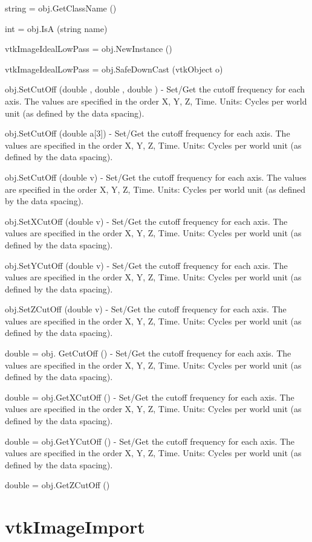 \begin{DoxyItemize}
\item {\ttfamily string = obj.\-Get\-Class\-Name ()}  
\item {\ttfamily int = obj.\-Is\-A (string name)}  
\item {\ttfamily vtk\-Image\-Ideal\-Low\-Pass = obj.\-New\-Instance ()}  
\item {\ttfamily vtk\-Image\-Ideal\-Low\-Pass = obj.\-Safe\-Down\-Cast (vtk\-Object o)}  
\item {\ttfamily obj.\-Set\-Cut\-Off (double , double , double )} -\/ Set/\-Get the cutoff frequency for each axis. The values are specified in the order X, Y, Z, Time. Units\-: Cycles per world unit (as defined by the data spacing).  
\item {\ttfamily obj.\-Set\-Cut\-Off (double a\mbox{[}3\mbox{]})} -\/ Set/\-Get the cutoff frequency for each axis. The values are specified in the order X, Y, Z, Time. Units\-: Cycles per world unit (as defined by the data spacing).  
\item {\ttfamily obj.\-Set\-Cut\-Off (double v)} -\/ Set/\-Get the cutoff frequency for each axis. The values are specified in the order X, Y, Z, Time. Units\-: Cycles per world unit (as defined by the data spacing).  
\item {\ttfamily obj.\-Set\-X\-Cut\-Off (double v)} -\/ Set/\-Get the cutoff frequency for each axis. The values are specified in the order X, Y, Z, Time. Units\-: Cycles per world unit (as defined by the data spacing).  
\item {\ttfamily obj.\-Set\-Y\-Cut\-Off (double v)} -\/ Set/\-Get the cutoff frequency for each axis. The values are specified in the order X, Y, Z, Time. Units\-: Cycles per world unit (as defined by the data spacing).  
\item {\ttfamily obj.\-Set\-Z\-Cut\-Off (double v)} -\/ Set/\-Get the cutoff frequency for each axis. The values are specified in the order X, Y, Z, Time. Units\-: Cycles per world unit (as defined by the data spacing).  
\item {\ttfamily double = obj. Get\-Cut\-Off ()} -\/ Set/\-Get the cutoff frequency for each axis. The values are specified in the order X, Y, Z, Time. Units\-: Cycles per world unit (as defined by the data spacing).  
\item {\ttfamily double = obj.\-Get\-X\-Cut\-Off ()} -\/ Set/\-Get the cutoff frequency for each axis. The values are specified in the order X, Y, Z, Time. Units\-: Cycles per world unit (as defined by the data spacing).  
\item {\ttfamily double = obj.\-Get\-Y\-Cut\-Off ()} -\/ Set/\-Get the cutoff frequency for each axis. The values are specified in the order X, Y, Z, Time. Units\-: Cycles per world unit (as defined by the data spacing).  
\item {\ttfamily double = obj.\-Get\-Z\-Cut\-Off ()}  
\end{DoxyItemize}\hypertarget{vtkimaging_vtkimageimport}{}\section{vtk\-Image\-Import}\label{vtkimaging_vtkimageimport}
